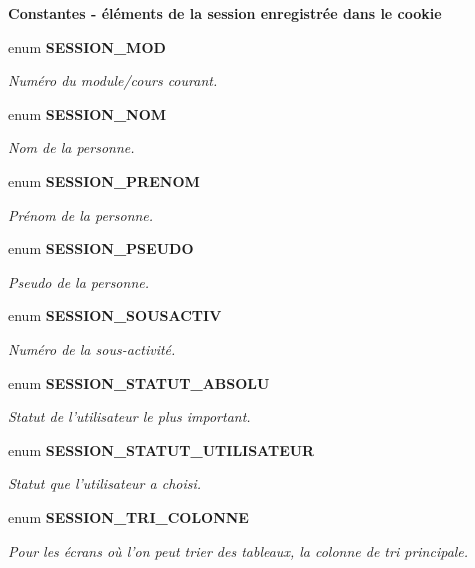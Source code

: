 \begin{Indent}{\bf Constantes - éléments de la session enregistrée dans le cookie}
\begin{CompactItemize}
enum {\bf SESSION\_\-MOD} 
\begin{CompactList}\small\item\em Numéro du module/cours courant. \item\end{CompactList}\item 
enum {\bf SESSION\_\-NOM} 
\begin{CompactList}\small\item\em Nom de la personne. \item\end{CompactList}\item 
enum {\bf SESSION\_\-PRENOM} 
\begin{CompactList}\small\item\em Prénom de la personne. \item\end{CompactList}\item 
enum {\bf SESSION\_\-PSEUDO} 
\begin{CompactList}\small\item\em Pseudo de la personne. \item\end{CompactList}\item 
enum {\bf SESSION\_\-SOUSACTIV} 
\begin{CompactList}\small\item\em Numéro de la sous-activité. \item\end{CompactList}\item 
enum {\bf SESSION\_\-STATUT\_\-ABSOLU} 
\begin{CompactList}\small\item\em Statut de l'utilisateur le plus important. \item\end{CompactList}\item 
enum {\bf SESSION\_\-STATUT\_\-UTILISATEUR} 
\begin{CompactList}\small\item\em Statut que l'utilisateur a choisi. \item\end{CompactList}\item 
enum {\bf SESSION\_\-TRI\_\-COLONNE} 
\begin{CompactList}\small\item\em Pour les écrans où l'on peut trier des tableaux, la colonne de tri principale. \item\end{CompactList}\item 

\end{CompactItemize}
\end{Indent}
